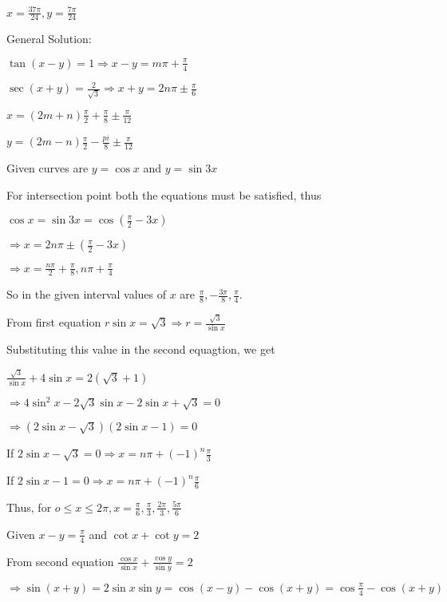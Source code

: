   $x = \frac{37\pi}{24}, y = \frac{7\pi}{24}$

  General Solution:

  $\tan(x - y) = 1 \Rightarrow x - y = m\pi + \frac{\pi}{4}$

  $\sec(x + y) = \frac{2}{\sqrt{3}} \Rightarrow x + y = 2n\pi \pm \frac{\pi}{6}$

  $x = (2m + n)\frac{\pi}{2} + \frac{\pi}{8}\pm \frac{\pi}{12}$

  $y = (2m - n)\frac{\pi}{2} - \frac{pi}{8}\pm \frac{\pi}{12}$

\item Given curves are $y = \cos x$ and $y = \sin 3x$

  For intersection point both the equations must be satisfied, thus

  $\cos x = \sin 3x = \cos\left(\frac{\pi}{2} - 3x\right)$

  $\Rightarrow x = 2n\pi \pm \left(\frac{\pi}{2} - 3x\right)$

  $\Rightarrow x = \frac{n\pi}{2} + \frac{\pi}{8}, n\pi + \frac{\pi}{4}$

  So in the given interval values of $x$ are $\frac{\pi}{8}, -\frac{3\pi}{8}, \frac{\pi}{4}.$

\item From first equation $r\sin x = \sqrt{3} \Rightarrow r = \frac{\sqrt{3}}{\sin x}$

  Substituting this value in the second equagtion, we get

  $\frac{\sqrt{3}}{\sin x} + 4\sin x = 2(\sqrt{3} + 1)$

  $\Rightarrow 4\sin^2x - 2\sqrt{3}\sin x - 2\sin x + \sqrt{3} = 0$

  $\Rightarrow (2\sin x - \sqrt{3})(2\sin x - 1) = 0$

  If $2\sin x - \sqrt{3} = 0 \Rightarrow x = n\pi + (-1)^n\frac{\pi}{3}$

  If $2\sin x - 1 = 0 \Rightarrow x = n\pi + (-1)^n\frac{\pi}{6}$

  Thus, for $o\leq x\leq 2\pi, x = \frac{\pi}{6}, \frac{\pi}{3}, \frac{2\pi}{3}, \frac{5\pi}{6}$

\item Given $x - y = \frac{\pi}{4}$ and $\cot x + \cot y = 2$

  From second equation $\frac{\cos x}{\sin x} + \frac{\cos y}{\sin y} = 2$

  $\Rightarrow \sin(x + y) = 2\sin x\sin y = \cos(x - y) - \cos(x + y) = \cos \frac{\pi}{4} - \cos(x + y)$

